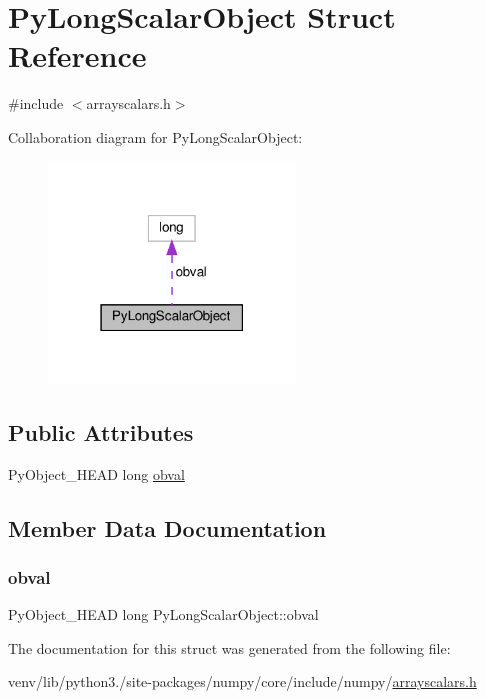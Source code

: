 \hypertarget{structPyLongScalarObject}{}\section{Py\+Long\+Scalar\+Object Struct Reference}
\label{structPyLongScalarObject}


{\ttfamily \#include $<$arrayscalars.\+h$>$}



Collaboration diagram for Py\+Long\+Scalar\+Object\+:
\nopagebreak
\begin{figure}[H]
\begin{center}
\leavevmode
\includegraphics[width=186pt]{structPyLongScalarObject__coll__graph}
\end{center}
\end{figure}
\subsection*{Public Attributes}
\begin{DoxyCompactItemize}
\item 
Py\+Object\+\_\+\+H\+E\+AD long \hyperlink{structPyLongScalarObject_a34888744cd25d4bd8e4d902e8ea6875e}{obval}
\end{DoxyCompactItemize}


\subsection{Member Data Documentation}
\mbox{\label{structPyLongScalarObject_a34888744cd25d4bd8e4d902e8ea6875e}} 
\subsubsection{\texorpdfstring{obval}{obval}}
{\footnotesize\ttfamily Py\+Object\+\_\+\+H\+E\+AD long Py\+Long\+Scalar\+Object\+::obval}



The documentation for this struct was generated from the following file\+:\begin{DoxyCompactItemize}
\item 
venv/lib/python3./site-\/packages/numpy/core/include/numpy/\hyperlink{arrayscalars_8h}{arrayscalars.\+h}\end{DoxyCompactItemize}
